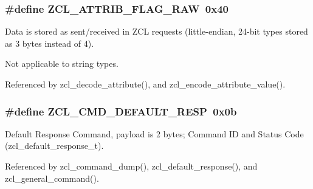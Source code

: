 \hypertarget{group__zcl_gae40d06ea09e652f6c68fd13e61eb9624}{
\subsubsection[{Z\-C\-L\-\_\-\-A\-T\-T\-R\-I\-B\-\_\-\-F\-L\-A\-G\-\_\-\-R\-A\-W}]{\setlength{\rightskip}{0pt plus 5cm}\#define Z\-C\-L\-\_\-\-A\-T\-T\-R\-I\-B\-\_\-\-F\-L\-A\-G\-\_\-\-R\-A\-W~0x40}}\label{group__zcl_gae40d06ea09e652f6c68fd13e61eb9624}


Data is stored as sent/received in Z\-C\-L requests (little-\/endian, 24-\/bit types stored as 3 bytes instead of 4). 

Not applicable to string types. 

Referenced by zcl\-\_\-decode\-\_\-attribute(), and zcl\-\_\-encode\-\_\-attribute\-\_\-value().

\hypertarget{group__zcl_ga92499f538455b8d5a525510fba54adb2}{
\subsubsection[{Z\-C\-L\-\_\-\-C\-M\-D\-\_\-\-D\-E\-F\-A\-U\-L\-T\-\_\-\-R\-E\-S\-P}]{\setlength{\rightskip}{0pt plus 5cm}\#define Z\-C\-L\-\_\-\-C\-M\-D\-\_\-\-D\-E\-F\-A\-U\-L\-T\-\_\-\-R\-E\-S\-P~0x0b}}\label{group__zcl_ga92499f538455b8d5a525510fba54adb2}


Default Response Command, payload is 2 bytes; Command I\-D and Status Code (zcl\-\_\-default\-\_\-response\-\_\-t). 



Referenced by zcl\-\_\-command\-\_\-dump(), zcl\-\_\-default\-\_\-response(), and zcl\-\_\-general\-\_\-command().


